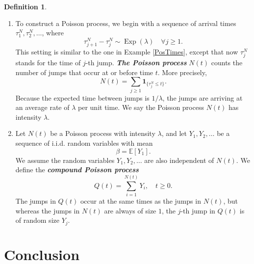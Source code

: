 \documentclass[a4paper,11pt]{article}
\theoremstyle{plain}
\theoremstyle{definition}
\newtheorem{defn}[thm]{Definition}
\newcommand{\ME}{\mathbb{E}}
\newcommand{\define}[1]{\textit{\textbf{#1}}}
\begin{document}
    \begin{defn} \
    	\begin{enumerate}
    		\item To construct a Poisson process, we begin with a sequence of arrival times $\tau_1^N, \tau_2^N, \dots$, where
    		\[ \tau_{j+1}^N - \tau_j^N \sim \operatorname{Exp}(\lambda) \quad \forall j \geq 1.  \]
    		This setting is similar to the one in Example \ref{PosTimes}, except that now $\tau_j^N$ stands for the time of $j$-th jump. \define{The Poisson process} $N(t)$ counts the number of jumps that occur at or before time $t$. More precisely,
    		\[ N(t) = \sum_{j \geq 1} \mathbf{1}_{ \{\tau_j^N \leq t\}}. \]
    		Because the expected time between jumps is $1/\lambda$, the jumps are arriving at an average rate of $\lambda$ per unit time. We say the Poisson process $N(t)$ has intensity $\lambda$.
    		\item Let $N(t)$ be a Poisson process with intensity $\lambda$, and let $Y_1, Y_2, \dots$ be a sequence of i.i.d. random variables with mean
    		\[ \beta = \ME[Y_1]. \]
    		We assume the random variables $Y_1, Y_2, \dots$ are also independent of $N(t)$. We define the \define{compound Poisson process}
    		\[ Q(t) = \sum_{i=1}^{N(t)} Y_i, \quad t \geq 0. \]
    		The jumps in $Q(t)$ occur at the same times as the jumps in $N(t)$, but whereas the jumps in $N(t)$ are always of size $1$, the $j$-th jump in $Q(t)$ is of random size $Y_j$.
    	\end{enumerate}
    \end{defn}
    
    \pagebreak
    \part{Conclusion}
    
\end{document}
